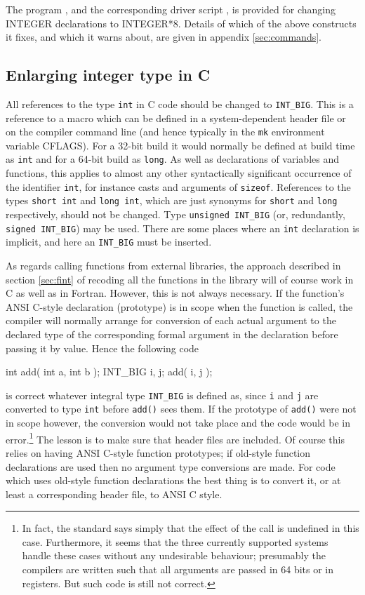 \documentclass[twoside,11pt,nolof]{starlink}
\providecommand{\xroutine}[1]{\htmlref{\texttt{#1}}{#1}}
\providecommand{\xdofilter}[1]{\htmlref{\texttt{do-#1}}{do-xxx}}
\providecommand{\file}[1]{\texttt{#1}}
\providecommand{\cc}[1]{\texttt{#1}}
\newenvironment{squote}{\begin{small}}{\end{small}}
\begin{document}
The program \xroutine{frepint}, and the corresponding driver script
\xdofilter{frepint}, is provided for changing
INTEGER declarations to INTEGER*8.
Details of which of the above constructs it fixes, and which it
warns about, are given in
appendix \ref{sec:commands}.


\subsection{Enlarging integer type in C\label{sec:cint}}

All references to the type \cc{int} in C code should be changed to
\cc{INT\_BIG}.  This is a reference to a macro which can be defined
in a system-dependent header file or on the compiler command line
(and hence typically in the \file{mk} environment variable CFLAGS).
For a 32-bit build it would normally be defined at build time as
\cc{int} and for a 64-bit build as \cc{long}.
As well as declarations of variables and functions, this applies
to almost any other syntactically significant occurrence of the
identifier \cc{int}, for instance casts and arguments of \cc{sizeof}.
References to the types \cc{short~int} and \cc{long~int},
which are just synonyms for \cc{short} and \cc{long} respectively,
should not be changed.  Type \cc{unsigned~INT\_BIG}
(or, redundantly, \cc{signed~INT\_BIG}) may be used.
There are some places where an \cc{int} declaration is implicit,
and here an \cc{INT\_BIG} must be inserted.

As regards calling functions from external libraries,
the approach described in section \ref{sec:fint} of
recoding all the functions in the library will of course work in C
as well as in Fortran.
However, this is not always necessary.
If the function's ANSI C-style declaration (prototype) is in scope when
the function is called,
the compiler will normally arrange for conversion
of each actual argument to the declared type of
the corresponding formal argument in the declaration
before passing it by value.
Hence the following code
\begin{squote}
\begin{terminalv}
int add( int a, int b );
INT_BIG i, j;
add( i, j );
\end{terminalv}
\end{squote}
is correct whatever integral type \cc{INT\_BIG} is defined as,
since \cc{i} and \cc{j} are converted to type \cc{int}
before \cc{add()} sees them.
If the prototype of \cc{add()} were not in scope however,
the conversion would not take place and the code would be
in error.\footnote{
   In fact, the standard says simply that the effect of the call is
   undefined in this case.  Furthermore, it seems that the three
   currently supported systems handle these cases without
   any undesirable behaviour; presumably the compilers are written
   such that all arguments are passed in 64 bits or in registers.
   But such code is still not correct.
}
The lesson is to make sure that header files are
included.
Of course this relies on having ANSI C-style function prototypes;
if old-style function declarations are used then no argument type
conversions are made.  For code which uses old-style function
declarations the best thing is to convert it,
or at least a corresponding header file,
to ANSI C style.
\end{document}
